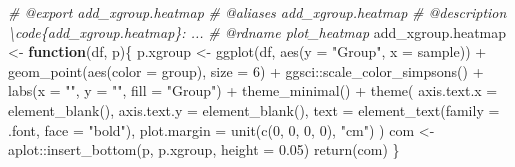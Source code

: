 \documentclass[
]{article}
\newenvironment{Shaded}{\begin{snugshade}}{\end{snugshade}}
\newcommand{\AttributeTok}[1]{\textcolor[rgb]{0.77,0.63,0.00}{#1}}
\newcommand{\CommentTok}[1]{\textcolor[rgb]{0.56,0.35,0.01}{\textit{#1}}}
\newcommand{\ControlFlowTok}[1]{\textcolor[rgb]{0.13,0.29,0.53}{\textbf{#1}}}
\newcommand{\DecValTok}[1]{\textcolor[rgb]{0.00,0.00,0.81}{#1}}
\newcommand{\FloatTok}[1]{\textcolor[rgb]{0.00,0.00,0.81}{#1}}
\newcommand{\FunctionTok}[1]{\textcolor[rgb]{0.00,0.00,0.00}{#1}}
\newcommand{\NormalTok}[1]{#1}
\newcommand{\OtherTok}[1]{\textcolor[rgb]{0.56,0.35,0.01}{#1}}
\newcommand{\SpecialCharTok}[1]{\textcolor[rgb]{0.00,0.00,0.00}{#1}}
\newcommand{\StringTok}[1]{\textcolor[rgb]{0.31,0.60,0.02}{#1}}
\begin{document}
\begin{Shaded}
\begin{Highlighting}[]
\CommentTok{\#\textquotesingle{} @export add\_xgroup.heatmap}
\CommentTok{\#\textquotesingle{} @aliases add\_xgroup.heatmap}
\CommentTok{\#\textquotesingle{} @description \textbackslash{}code\{add\_xgroup.heatmap\}: ...}
\CommentTok{\#\textquotesingle{} @rdname plot\_heatmap}
\NormalTok{add\_xgroup.heatmap }\OtherTok{\textless{}{-}} 
  \ControlFlowTok{function}\NormalTok{(df, p)\{}
\NormalTok{    p.xgroup }\OtherTok{\textless{}{-}} \FunctionTok{ggplot}\NormalTok{(df, }\FunctionTok{aes}\NormalTok{(}\AttributeTok{y =} \StringTok{"Group"}\NormalTok{, }\AttributeTok{x =}\NormalTok{ sample)) }\SpecialCharTok{+}
      \FunctionTok{geom\_point}\NormalTok{(}\FunctionTok{aes}\NormalTok{(}\AttributeTok{color =}\NormalTok{ group), }\AttributeTok{size =} \DecValTok{6}\NormalTok{) }\SpecialCharTok{+}
\NormalTok{      ggsci}\SpecialCharTok{::}\FunctionTok{scale\_color\_simpsons}\NormalTok{() }\SpecialCharTok{+}
      \FunctionTok{labs}\NormalTok{(}\AttributeTok{x =} \StringTok{""}\NormalTok{, }\AttributeTok{y =} \StringTok{""}\NormalTok{, }\AttributeTok{fill =} \StringTok{"Group"}\NormalTok{) }\SpecialCharTok{+}
      \FunctionTok{theme\_minimal}\NormalTok{() }\SpecialCharTok{+}
      \FunctionTok{theme}\NormalTok{(}
        \AttributeTok{axis.text.x =} \FunctionTok{element\_blank}\NormalTok{(),}
        \AttributeTok{axis.text.y =} \FunctionTok{element\_blank}\NormalTok{(),}
        \AttributeTok{text =} \FunctionTok{element\_text}\NormalTok{(}\AttributeTok{family =}\NormalTok{ .font, }\AttributeTok{face =} \StringTok{"bold"}\NormalTok{),}
        \AttributeTok{plot.margin =} \FunctionTok{unit}\NormalTok{(}\FunctionTok{c}\NormalTok{(}\DecValTok{0}\NormalTok{, }\DecValTok{0}\NormalTok{, }\DecValTok{0}\NormalTok{, }\DecValTok{0}\NormalTok{), }\StringTok{"cm"}\NormalTok{)}
\NormalTok{      )}
\NormalTok{      com }\OtherTok{\textless{}{-}}\NormalTok{ aplot}\SpecialCharTok{::}\FunctionTok{insert\_bottom}\NormalTok{(p, p.xgroup, }\AttributeTok{height =} \FloatTok{0.05}\NormalTok{)}
      \FunctionTok{return}\NormalTok{(com)}
\NormalTok{  \}}


\end{Highlighting}
\end{Shaded}
\end{document}
